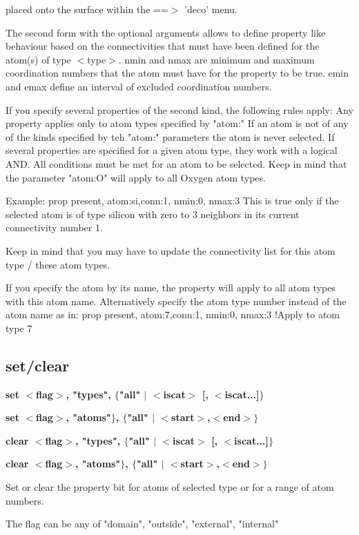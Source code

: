          placed onto the surface within the ==$> $ 'deco' menu. 
\par
The second form with the optional arguments allows to define 
property like behaviour based on the connectivities that must 
have been defined for the atom(s) of type $ <$type$> $. 
nmin and nmax are minimum and maximum coordination numbers that the 
     atom must have for the property to be true. 
emin and emax define an interval of excluded coordination numbers. 
\par
If you specify several properties of the second kind, the following 
rules apply: 
Any property applies only to atom types specified by "atom:" 
If an atom is not of any of the kinds specified by teh "atom:" 
parameters the atom is never selected. 
If several properties are specified for a given atom type, they 
work with a logical AND. All conditions must be met for an atom 
to be selected. 
Keep in mind that the parameter "atom:O" will apply to all 
Oxygen atom types. 
\par
Example: 
prop present, atom:si,conn:1, nmin:0, nmax:3 
This is true only if the selected atom is of type silicon with 
zero to 3 neighbors in its current connectivity number 1. 
\par
Keep in mind that you may have to update the connectivity 
list for this atom type / these atom types. 
\par
If you specify the atom by its name, the property will 
apply to all atom types with this atom name. Alternatively 
specify the atom type number instead of the atom name as in: 
prop present, atom:7,conn:1, nmin:0, nmax:3 !Apply to atom type 7 
\subsection*{set/clear}
{\bf set   $ <$flag$> $, "types",  $ \{$"all" $| $ $ <$iscat$> $ [, $ <$iscat...]$\} $ \par }
{\bf set   $ <$flag$> $, "atoms"$\} $, $ \{$"all" $| $ $ <$start$> $,$ <$end$> $$\} $ \par }
{\bf clear $ <$flag$> $, "types",  $ \{$"all" $| $ $ <$iscat$> $ [, $ <$iscat...]$\} $ \par }
{\bf clear $ <$flag$> $, "atoms"$\} $, $ \{$"all" $| $ $ <$start$> $,$ <$end$> $$\} $ \par }
\par
\vspace{3pt}
Set or clear the property bit for atoms of selected type or 
for a range of atom numbers. 
\par
The flag can be any of "domain", "outside", "external", "internal" 
